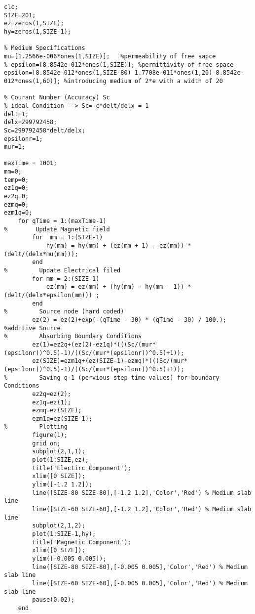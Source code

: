 \begin{lstlisting}
clc;
SIZE=201;
ez=zeros(1,SIZE);
hy=zeros(1,SIZE-1);

% Medium Specifications
mu=[1.2566e-006*ones(1,SIZE)];   %permeability of free sapce
% epsilon=[8.8542e-012*ones(1,SIZE)]; %permittivity of free space 
epsilon=[8.8542e-012*ones(1,SIZE-80) 1.7708e-011*ones(1,20) 8.8542e-012*ones(1,60)]; %introducing medium of 2*e with a width of 20

% Courant Number (Accuracy) Sc
% ideal Condition --> Sc= c*delt/delx = 1
delt=1;
delx=299792458;
Sc=299792458*delt/delx;
epsilonr=1;
mur=1;

maxTime = 1001;
mm=0;
temp=0;
ez1q=0;
ez2q=0;
ezmq=0;
ezm1q=0;
    for qTime = 1:(maxTime-1)
%        Update Magnetic field
        for  mm = 1:(SIZE-1)
            hy(mm) = hy(mm) + (ez(mm + 1) - ez(mm)) * (delt/(delx*mu(mm)));
        end
%         Update Electrical filed
        for mm = 2:(SIZE-1)
            ez(mm) = ez(mm) + (hy(mm) - hy(mm - 1)) * (delt/(delx*epsilon(mm))) ;
        end
%         Source node (hard coded)
        ez(2) = ez(2)+exp(-(qTime - 30) * (qTime - 30) / 100.); %additive Source
%         Absorbing Boundary Conditions
        ez(1)=ez2q+(ez(2)-ez1q)*(((Sc/(mur*(epsilonr))^0.5)-1)/((Sc/(mur*(epsilonr))^0.5)+1));
        ez(SIZE)=ezm1q+(ez(SIZE-1)-ezmq)*(((Sc/(mur*(epsilonr))^0.5)-1)/((Sc/(mur*(epsilonr))^0.5)+1));
%         Saving q-1 (pervious step time values) for boundary Conditions
        ez2q=ez(2);
        ez1q=ez(1);
        ezmq=ez(SIZE);
        ezm1q=ez(SIZE-1);
%         Plotting
        figure(1);
        grid on; 
        subplot(2,1,1);
        plot(1:SIZE,ez);
        title('Electirc Component');
        xlim([0 SIZE]);
        ylim([-1.2 1.2]);
        line([SIZE-80 SIZE-80],[-1.2 1.2],'Color','Red') % Medium slab line
        line([SIZE-60 SIZE-60],[-1.2 1.2],'Color','Red') % Medium slab line
        subplot(2,1,2);
        plot(1:SIZE-1,hy);
        title('Magnetic Component');
        xlim([0 SIZE]);
        ylim([-0.005 0.005]);
        line([SIZE-80 SIZE-80],[-0.005 0.005],'Color','Red') % Medium slab line
        line([SIZE-60 SIZE-60],[-0.005 0.005],'Color','Red') % Medium slab line
        pause(0.02);
    end
\end{lstlisting}

